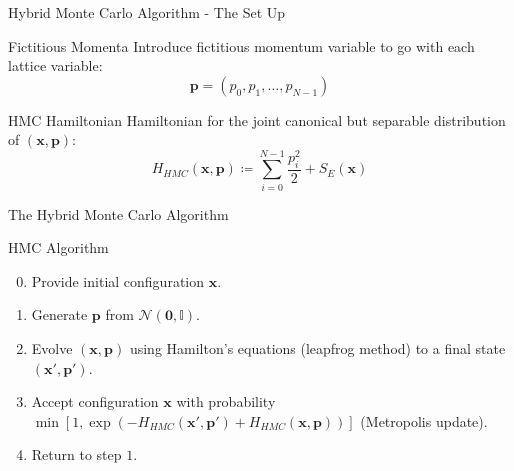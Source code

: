 \documentclass{beamer}
\begin{document}
    \begin{frame}{Hybrid Monte Carlo Algorithm - The Set Up}
        {
            \begin{block}{Fictitious Momenta}
            {   
                Introduce fictitious momentum variable to go with each lattice variable:
                \begin{equation*}
                    \label{eq:FictitiousMomenta}
                    \bm{p} = \left(p_0,p_1,\dots,p_{N-1}\right)
                \end{equation*}
            }
            \end{block}
        }
        {
            \begin{block}{HMC Hamiltonian}
                {
                Hamiltonian for the joint canonical but separable distribution of $\left(\bm{x},\bm{p}\right)$:
                \begin{equation*}
                    \label{eq:HMCHamiltonian}
                    H_{HMC}\left(\bm{x},\bm{p}\right) \coloneqq \sum_{i=0}^{N-1} \frac{ p_{i}^{2} } {2} + S_{E}\left(\bm{x}\right)
                \end{equation*}
                }
            \end{block}
        }
    \end{frame}
    \begin{frame}{The Hybrid Monte Carlo Algorithm}
        {
            \begin{block}{HMC Algorithm}
                \begin{enumerate} 
                    \setcounter{enumi}{-1}

                    \item<1-> Provide initial configuration $\bm{x}$.

                    \item<2-> Generate $\bm{p}$ from $\mathcal{N}\left(\bm{0},\mathbb{I}\right)$.

                    \item<3-> Evolve $\left(\bm{x}, \bm{p}\right)$ using Hamilton's equations (leapfrog method) to a final state $\left(\bm{x}', \bm{p}'\right)$.

                    \item<4-> Accept configuration $\bm{x}$ with probability $ \min{\left[1,\exp{\left(-H_{HMC}\left(\bm{x}',\bm{p}'\right)+H_{HMC}\left(\bm{x},\bm{p}\right)\right)}\right]}$ (Metropolis update).

                    \item<5-> Return to step $1$.
                \end{enumerate}
            \end{block}
        } 
    \end{frame}
\end{document}
